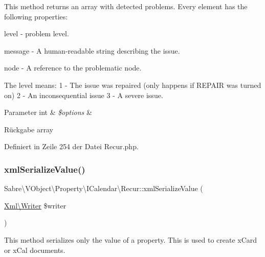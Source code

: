 This method returns an array with detected problems. Every element has the following properties\+:


\begin{DoxyItemize}
\item level -\/ problem level.
\item message -\/ A human-\/readable string describing the issue.
\item node -\/ A reference to the problematic node.
\end{DoxyItemize}

The level means\+: 1 -\/ The issue was repaired (only happens if R\+E\+P\+A\+IR was turned on) 2 -\/ An inconsequential issue 3 -\/ A severe issue.


\begin{DoxyParams}[1]{Parameter}
int & {\em \$options} & \\
\hline
\end{DoxyParams}
\begin{DoxyReturn}{Rückgabe}
array 
\end{DoxyReturn}


Definiert in Zeile 254 der Datei Recur.\+php.

\mbox{\label{class_sabre_1_1_v_object_1_1_property_1_1_i_calendar_1_1_recur_acac9ea5d848a9d2e6244765bf4c024c9}} 
\subsubsection{\texorpdfstring{xml\+Serialize\+Value()}{xmlSerializeValue()}}
{\footnotesize\ttfamily Sabre\textbackslash{}\+V\+Object\textbackslash{}\+Property\textbackslash{}\+I\+Calendar\textbackslash{}\+Recur\+::xml\+Serialize\+Value (\begin{DoxyParamCaption}\item[{\mbox{\hyperlink{class_sabre_1_1_xml_1_1_writer}{Xml\textbackslash{}\+Writer}}}]{\$writer }\end{DoxyParamCaption})\hspace{0.3cm}{\ttfamily [protected]}}

This method serializes only the value of a property. This is used to create x\+Card or x\+Cal documents.


